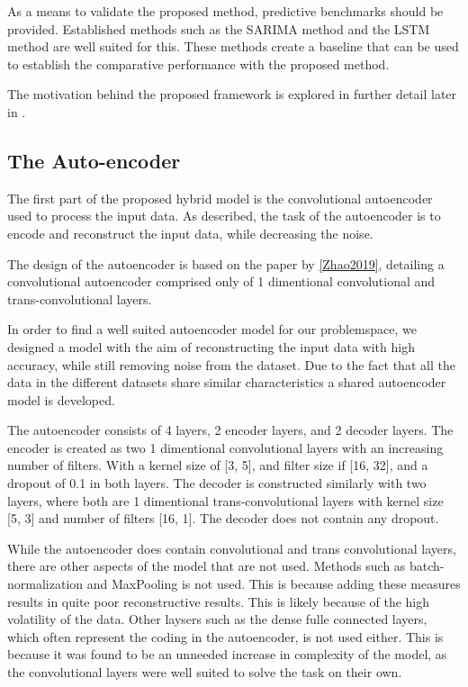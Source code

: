 As a means to validate the proposed method, predictive benchmarks should be provided.
Established methods such as the SARIMA method and the LSTM method are well suited for this.
These methods create a baseline that can be used to establish the comparative performance with the proposed method.

The motivation behind the proposed framework is explored in further detail later in .



\subsection{The Auto-encoder}

The first part of the proposed hybrid model is the convolutional autoencoder used to process the input data.
As described, the task of the autoencoder is to encode and reconstruct the input data,
while decreasing the noise.

The design of the autoencoder is based on the paper by \cref{Zhao2019},
detailing a convolutional autoencoder comprised only of 1 dimentional convolutional and trans-convolutional layers.


In order to find a well suited autoencoder model for our problemspace,
we designed a model with the aim of reconstructing the input data with high accuracy,
while still removing noise from the dataset.
Due to the fact that all the data in the different datasets share similar characteristics
a shared autoencoder model is developed.

The autoencoder consists of 4 layers, 2 encoder layers, and 2 decoder layers.
The encoder is created as two 1 dimentional convolutional layers with an increasing number of filters.
With a kernel size of [3, 5], and filter size if [16, 32], and a dropout of 0.1 in both layers.
The decoder is constructed similarly with two layers, where both are 1 dimentional trans-convolutional layers
with kernel size [5, 3] and number of filters [16, 1].
The decoder does not contain any dropout.


While the autoencoder does contain convolutional and trans convolutional layers,
there are other aspects of the model that are not used.
Methods such as batch-normalization and MaxPooling is not used.
This is because adding these measures results in quite poor reconstructive results.
This is likely because of the high volatility of the data.
Other laysers such as the dense fulle connected layers, which often represent the coding in the autoencoder,
is not used either.
This is because it was found to be an unneeded increase in complexity of the model,
as the convolutional layers were well suited to solve the task on their own.


